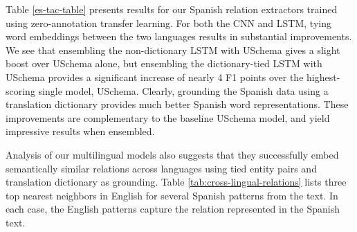 Table \ref{es-tac-table} presents results for our Spanish relation extractors trained using zero-annotation transfer learning. For both the CNN and LSTM, tying word embeddings between the two languages results in substantial improvements. We see that ensembling the non-dictionary LSTM with USchema gives a slight boost over USchema alone, but ensembling the dictionary-tied LSTM with USchema provides a significant increase of nearly 4 F1 points over the highest-scoring single model, USchema. Clearly, grounding the Spanish data using a translation dictionary provides much better Spanish word representations. These improvements are complementary to the baseline USchema model, and yield impressive results when ensembled.



Analysis of our multilingual models also suggests that they successfully embed semantically similar relations across languages using tied entity pairs and translation dictionary as grounding. Table \ref{tab:cross-lingual-relations} lists three top nearest neighbors in English for several Spanish patterns from the text. In each case, the English patterns capture the relation represented in the Spanish text. 

